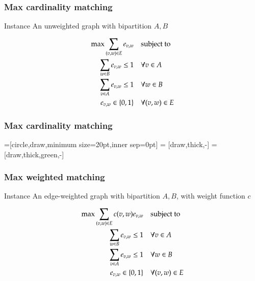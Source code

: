 \begin{frame}[fragile]
\frametitle{Max cardinality matching}

\begin{block}{Instance}
An unweighted graph \g with bipartition \(A,B\)
\end{block}

\begin{align}
  \max \sum_{(v,w)\in E} e_{v,w}                  \quad&\text{subject to }\\
  \sum_{w\in B} e_{v,w} \le 1 \quad& \forall v\in A           \\
  \sum_{v\in A} e_{v,w} \le 1 \quad& \forall w\in B           \\
  e_{v,w}\in \{0,1\}         \quad& \forall (v,w)\in E \notag
\end{align}
\end{frame}

\begin{frame}[fragile]
\frametitle{Max cardinality matching}

=[circle,draw,minimum size=20pt,inner sep=0pt]
 = [draw,thick,-]
 = [draw,thick,green,-]
\begin{figure}
\end{figure}
\end{frame}


\begin{frame}[fragile]
\frametitle{Max weighted matching}

\begin{block}{Instance}
An edge-weighted graph \g with bipartition \(A,B\), with weight function \(c\)
\end{block}

\begin{align}
  \max \sum_{(v,w)\in E} c(v,w)e_{v,w}                  \quad&\text{subject to }\\
  \sum_{w\in B} e_{v,w} \le 1 \quad& \forall v\in A           \\
  \sum_{v\in A} e_{v,w} \le 1 \quad& \forall w\in B           \\
  e_{v,w}\in \{0,1\}         \quad& \forall (v,w)\in E \notag
\end{align}
\end{frame}

